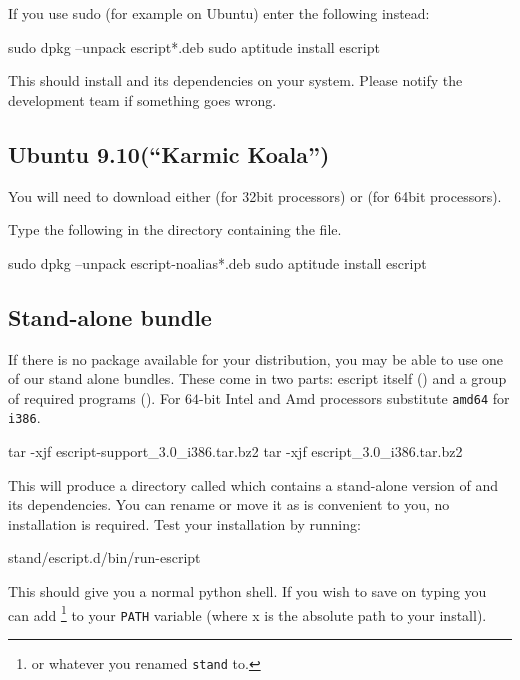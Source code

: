 If you use sudo (for example on Ubuntu) enter the following instead:
\begin{shellCode}
sudo dpkg --unpack escript*.deb
sudo aptitude install escript
\end{shellCode}

This should install \esfinley and its dependencies on your system.
Please notify the development team if something goes wrong.

\subsection{Ubuntu 9.10(``Karmic Koala'')}\label{sec:karmic}

You will need to download either  (for 32bit processors) or  (for 64bit processors).

Type the following in the directory containing the file.
\begin{shellCode}
sudo dpkg --unpack escript-noalias*.deb
sudo aptitude install escript
\end{shellCode}



\subsection{Stand-alone bundle}\label{sec:standalonelinux}

If there is no package available for your distribution, you may be able to use one of our stand alone bundles.
These come in two parts: escript itself () and a group of required programs (). For $64$-bit Intel and Amd processors substitute \texttt{amd64} for \texttt{i386}.
\begin{shellCode}
tar -xjf escript-support_3.0_i386.tar.bz2
tar -xjf escript_3.0_i386.tar.bz2
\end{shellCode}
This will produce a directory called  which contains a stand-alone version of \esfinley and its dependencies.
You can rename or move it as is convenient to you, no installation is required.
Test your installation by running:
\begin{shellCode}
stand/escript.d/bin/run-escript
\end{shellCode}
This should give you a normal python shell.
If you wish to save on typing you can add \footnote{or whatever you renamed \texttt{stand} to.} to your \texttt{PATH} variable (where x is the absolute path to your install).

